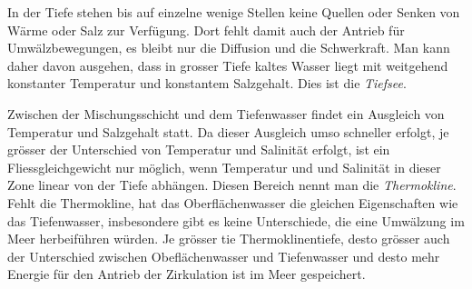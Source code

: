 In der Tiefe stehen bis auf einzelne wenige Stellen keine Quellen oder
Senken von Wärme oder Salz zur Verfügung.
Dort fehlt damit auch der Antrieb für Umwälzbewegungen, es bleibt
nur die Diffusion und die Schwerkraft.
Man kann daher davon ausgehen, dass in grosser Tiefe kaltes Wasser 
liegt mit weitgehend konstanter Temperatur und konstantem Salzgehalt.
Dies ist die {\em Tiefsee}.
%

Zwischen der Mischungsschicht und dem Tiefenwasser findet ein Ausgleich
von Temperatur und Salzgehalt statt.
Da dieser Ausgleich umso schneller erfolgt, je grösser der Unterschied
von Temperatur und Salinität erfolgt, ist ein Fliessgleichgewicht nur
möglich, wenn Temperatur und und Salinität in dieser Zone linear
von der Tiefe abhängen.
Diesen Bereich nennt man die {\em Thermokline}.
%
Fehlt die Thermokline, hat das Oberflächenwasser die gleichen Eigenschaften
wie das Tiefenwasser, insbesondere gibt es keine Unterschiede, die eine
Umwälzung im Meer herbeiführen würden.
Je grösser tie Thermoklinentiefe, desto grösser auch der Unterschied
zwischen Obeflächenwasser und Tiefenwasser und desto mehr Energie für
den Antrieb der Zirkulation ist im Meer gespeichert.

